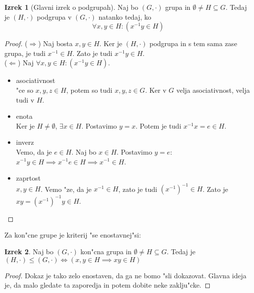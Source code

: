 \documentclass{article}
\theoremstyle{definition}
\newtheorem{theorem}{Izrek}[section]
\theoremstyle{remark}
\begin{document}
	\begin{theorem}[Glavni izrek o podgrupah]\label{glavniIzrekPodrgup}
		Naj bo $(G, \cdot)$ grupa in $\emptyset \neq H \subseteq G$. Tedaj je $(H, \cdot)$ podgrupa v $(G, \cdot)$ natanko tedaj, ko
		\[ \forall x,y \in H: (x^{-1}y \in H) \]
	\end{theorem}
	\begin{proof}
		($\Rightarrow$) Naj bosta $x,y \in H$. Ker je $(H, \cdot)$ podgrupa in s tem sama zase grupa, je tudi $x^{-1} \in H$. Zato je tudi $x^{-1}y \in H$.
		\\
		($\Leftarrow$) Naj $\forall x,y \in H: (x^{-1}y \in H)$.
		\begin{itemize}
			\item asociativnost \\
			"ce so $x,y,z \in H$, potem so tudi $x,y,z \in G$. Ker v $G$ velja asociativnost, velja tudi v $H$.
			
			\item enota \\
			Ker je $H \neq \emptyset$, $\exists x \in H$. Postavimo $y = x$. Potem je tudi $x^{-1}x = e \in H$.
			
			\item inverz \\
			Vemo, da je $e \in H$. Naj bo $x \in H$. Postavimo $y = e$: $x^{-1}y \in H \implies x^{-1}e \in H \implies x^{-1} \in H$.
			
			\item zaprtost \\
			$x, y \in H$. Vemo "ze, da je $x^{-1} \in H$, zato je tudi $(x^{-1})^{-1} \in H$. Zato je $xy = (x^{-1})^{-1}y \in H$.
		\end{itemize}
	\end{proof}
	
	Za kon"cne grupe je kriterij "se enostavnej"si:
	\begin{theorem}
		Naj bo $(G, \cdot)$ kon"cna grupa in $\emptyset \neq H \subseteq G$. Tedaj je $(H, \cdot) \leq (G, \cdot) \iff (x,y \in H \implies xy \in H)$
	\end{theorem}
	\begin{proof}
		Dokaz je tako zelo enostaven, da ga ne bomo "sli dokazovat. Glavna ideja je, da malo gledate ta zaporedja in potem dobite neke zaklju"cke. %
	\end{proof}
	
\end{document}
